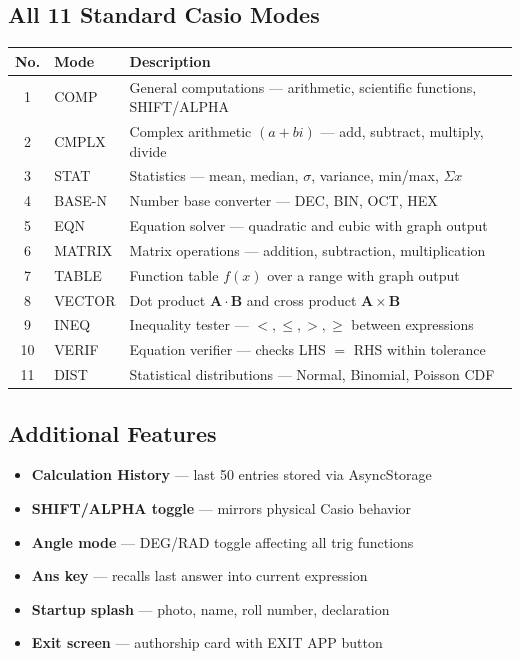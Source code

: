 \documentclass[12pt]{article}
\begin{document}
\subsection{All 11 Standard Casio Modes}
\begin{center}
\begin{tabular}{clp{8cm}}
\toprule
\textbf{No.} & \textbf{Mode} & \textbf{Description} \\
\midrule
1  & COMP   & General computations --- arithmetic, scientific functions, SHIFT/ALPHA \\
2  & CMPLX  & Complex arithmetic $(a+bi)$ --- add, subtract, multiply, divide \\
3  & STAT   & Statistics --- mean, median, $\sigma$, variance, min/max, $\Sigma x$ \\
4  & BASE-N & Number base converter --- DEC, BIN, OCT, HEX \\
5  & EQN    & Equation solver --- quadratic and cubic with graph output \\
6  & MATRIX & Matrix operations --- addition, subtraction, multiplication \\
7  & TABLE  & Function table $f(x)$ over a range with graph output \\
8  & VECTOR & Dot product $\mathbf{A}\cdot\mathbf{B}$ and cross product $\mathbf{A}\times\mathbf{B}$ \\
9  & INEQ   & Inequality tester --- $<,\leq,>,\geq$ between expressions \\
10 & VERIF  & Equation verifier --- checks LHS $=$ RHS within tolerance \\
11 & DIST   & Statistical distributions --- Normal, Binomial, Poisson CDF \\
\bottomrule
\end{tabular}
\end{center}

\subsection{Additional Features}
\begin{itemize}[leftmargin=1.5em]
  \item \textbf{Calculation History} --- last 50 entries stored via AsyncStorage
  \item \textbf{SHIFT/ALPHA toggle} --- mirrors physical Casio behavior
  \item \textbf{Angle mode} --- DEG/RAD toggle affecting all trig functions
  \item \textbf{Ans key} --- recalls last answer into current expression
  \item \textbf{Startup splash} --- photo, name, roll number, declaration
  \item \textbf{Exit screen} --- authorship card with EXIT APP button
\end{itemize}
\end{document}

